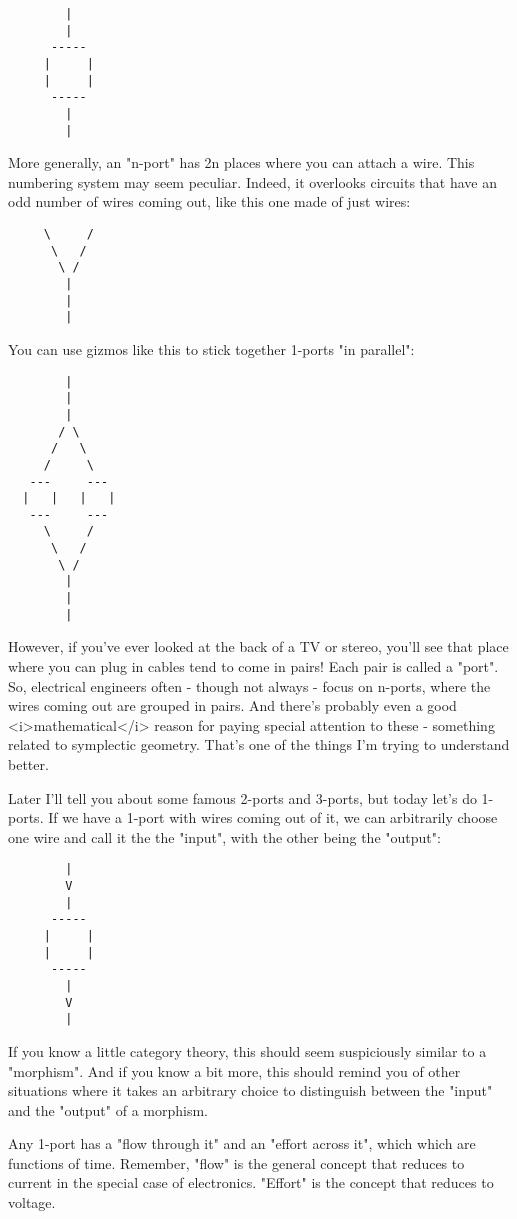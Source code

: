 \begin{verbatim}
        |
        |
      -----
     |     |
     |     |
      -----
        |
        |
\end{verbatim}
    

More generally, an "n-port" has 2n places where you can
attach a wire.  This numbering system may seem peculiar.  Indeed, it
overlooks circuits that have an odd number of wires coming out, like
this one made of just wires:

\begin{verbatim}
     \     /
      \   /
       \ /
        |
        |
        |
\end{verbatim}
    

You can use gizmos like this to stick together 1-ports 
"in parallel":


\begin{verbatim}
        |
        |
        |
       / \
      /   \
     /     \
   ---     ---
  |   |   |   |
   ---     ---
     \     /
      \   /
       \ /
        |
        |
        |
\end{verbatim}
    

However, if you've ever looked at the back of a TV or stereo, you'll
see that place where you can plug in cables tend to come in pairs!
Each pair is called a "port".  So, electrical engineers
often - though not always - focus on n-ports, where the wires coming
out are grouped in pairs.  And there's probably even a good
<i>mathematical</i> reason for paying special attention to these -
something related to symplectic geometry.  That's one of the things
I'm trying to understand better.

Later I'll tell you about some famous 2-ports and 3-ports, but today
let's do 1-ports.  If we have a 1-port with wires coming out of it, we
can arbitrarily choose one wire and call it the the "input",
with the other being the "output":

\begin{verbatim}
        |
        V
        |
      -----
     |     |
     |     |
      -----
        |
        V
        |
\end{verbatim}
    
If you know a little category theory, this should seem suspiciously
similar to a "morphism".  And if you know a bit more, this
should remind you of other situations where it takes an arbitrary
choice to distinguish between the "input" and the
"output" of a morphism.

Any 1-port has a "flow through it" and an "effort
across it", which which are functions of time.  Remember,
"flow" is the general concept that reduces to current in the
special case of electronics.  "Effort" is the concept that
reduces to voltage.

